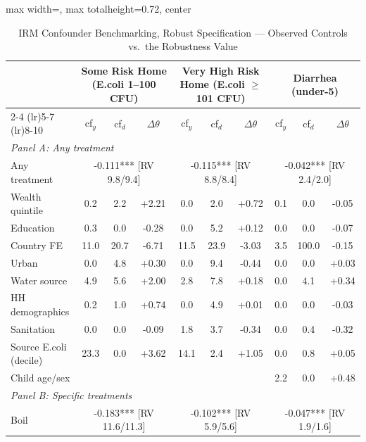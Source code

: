 \begin{landscape}
\begin{table}[htbp]
\centering
\caption{IRM Confounder Benchmarking, Robust Specification --- Observed Controls vs.\ the Robustness Value}
\label{tab:sensitivity-benchmark-irm-rob1}
\scriptsize
\setlength{\tabcolsep}{3pt}
\renewcommand{\arraystretch}{0.92}
\begin{adjustbox}{max width=\linewidth, max totalheight=0.72\textwidth, center}
\begin{tabular}{l|ccc|ccc|ccc}
\toprule
 & \multicolumn{3}{c|}{Some Risk Home (E.coli 1--100 CFU)} & \multicolumn{3}{c|}{Very High Risk Home (E.coli $\geq$ 101 CFU)} & \multicolumn{3}{c}{Diarrhea (under-5)} \\
\cmidrule(lr){2-4} \cmidrule(lr){5-7} \cmidrule(lr){8-10}
 & cf$_y$ & cf$_d$ & $\Delta\theta$ & cf$_y$ & cf$_d$ & $\Delta\theta$ & cf$_y$ & cf$_d$ & $\Delta\theta$ \\
\midrule
\multicolumn{10}{l}{\textit{Panel A: Any treatment}} \\
Any treatment & \multicolumn{3}{c|}{-0.111*** {\scriptsize[RV 9.8/9.4]}} & \multicolumn{3}{c|}{-0.115*** {\scriptsize[RV 8.8/8.4]}} & \multicolumn{3}{c}{-0.042*** {\scriptsize[RV 2.4/2.0]}} \\
\quad Wealth quintile & 0.2 & 2.2 & +2.21 & 0.0 & 2.0 & +0.72 & 0.1 & 0.0 & -0.05 \\
\quad Education & 0.3 & 0.0 & -0.28 & 0.0 & 5.2 & +0.12 & 0.0 & 0.0 & -0.07 \\
\quad Country FE & 11.0 & 20.7 & -6.71 & 11.5 & 23.9 & -3.03 & 3.5 & 100.0 & -0.15 \\
\quad Urban & 0.0 & 4.8 & +0.30 & 0.0 & 9.4 & -0.44 & 0.0 & 0.0 & +0.03 \\
\quad Water source & 4.9 & 5.6 & +2.00 & 2.8 & 7.8 & +0.18 & 0.0 & 4.1 & +0.34 \\
\quad HH demographics & 0.2 & 1.0 & +0.74 & 0.0 & 4.9 & +0.01 & 0.0 & 0.0 & -0.03 \\
\quad Sanitation & 0.0 & 0.0 & -0.09 & 1.8 & 3.7 & -0.34 & 0.0 & 0.4 & -0.32 \\
\quad Source E.coli (decile) & 23.3 & 0.0 & +3.62 & 14.1 & 2.4 & +1.05 & 0.0 & 0.8 & +0.05 \\
\quad Child age/sex &  &  &  &  &  &  & 2.2 & 0.0 & +0.48 \\
\midrule
\multicolumn{10}{l}{\textit{Panel B: Specific treatments}} \\
Boil & \multicolumn{3}{c|}{-0.183*** {\scriptsize[RV 11.6/11.3]}} & \multicolumn{3}{c|}{-0.102*** {\scriptsize[RV 5.9/5.6]}} & \multicolumn{3}{c}{-0.047*** {\scriptsize[RV 1.9/1.6]}} \\

\end{tabular}
\end{adjustbox}
\end{table}
\end{landscape}
